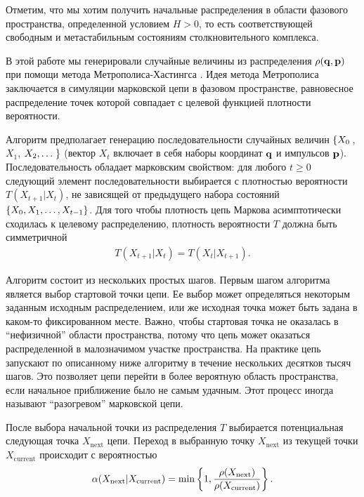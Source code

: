 Отметим, что мы хотим получить начальные распределения в области фазового пространства, определенной условием $H > 0$, то есть соответствующей свободным и метастабильным состояниям столкновительного комплекса. \par
В этой работе мы генерировали случайные величины из распределения $\rho(\mathbf{q}, \mathbf{p})$ при помощи метода Метрополиса-Хастингса \cite{liu2008}. Идея метода Метрополиса заключается в симуляции марковской цепи в фазовом пространстве, равновесное распределение точек которой совпадает с целевой функцией плотности вероятности. \par
Алгоритм предполагает генерацию последовательности случайных величин $\left\{ X_0 \right.$, $X_1$, $X_2, \dots \left. \right\}$ (вектор $X_t$ включает в себя наборы координат $\mathbf{q}$ и импульсов $\mathbf{p}$). Последовательность обладает марковским свойством: для любого $t \geq 0$ следующий элемент последовательности выбирается с плотностью вероятности $T(X_{t +1} \vert X_t)$, не зависящей от предыдущего набора состояний $\left\{ X_0, X_1, \dots, X_{t - 1} \right\}$. Для того чтобы плотность цепь Маркова асимптотически сходилась к целевому распределению, плотность вероятности $T$ должна быть симметричной 
\begin{gather}
    T(X_{t+1} \vert X_t) = T(X_t \vert X_{t+1}).
\end{gather}

Алгоритм состоит из нескольких простых шагов. Первым шагом алгоритма является выбор стартовой точки цепи. Ее выбор может определяться некоторым заданным исходным распределением, или же исходная точка может быть задана в каком-то фиксированном месте. Важно, чтобы стартовая точка не оказалась в \enquote{нефизичной} области пространства, потому что цепь может оказаться распределенной в малозначимом участке пространства. На практике цепь запускают по описанному ниже алгоритму в течение нескольких десятков тысяч шагов. Это позволяет цепи перейти в более вероятную область пространства, если начальное приближение было не самым удачным. Этот процесс иногда называют \enquote{разогревом} марковской цепи. \par
После выбора начальной точки из распределения $T$ выбирается потенциальная следующая точка $X_\text{next}$ цепи. Переход в выбранную точку $X_\text{next}$ из текущей точки $X_\text{current}$ происходит с вероятностью
\begin{gather}
    \alpha(X_\text{next} | X_\text{current}) = \min \left\{ 1, \frac{\rho(X_\text{next})}{\rho(X_\text{current})} \right\}.
\end{gather}

